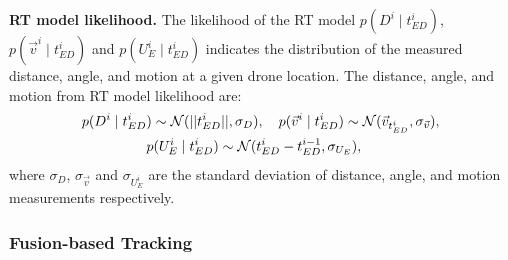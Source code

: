 \textbf{RT model likelihood.}
The likelihood of the RT model $p(D^i \mid t_{ED}^i)$, $p(\vec{v}^i \mid t_{ED}^i)$ and $p(U_E^{i} \mid t_{ED}^i)$ indicates the distribution of the measured distance, angle, and motion at a given drone location.
The distance, angle, and motion from RT model likelihood are:
\begin{equation}
\begin{aligned}
p(D^i \mid t_{ED}^i&) \sim  \mathcal{N}(||t_{ED}^i||, \sigma_{D}), \quad p(\vec{v}^i \mid t_{ED}^i) \sim \mathcal{N}(\vec{v}_{t_{ED}^i}, \sigma_{\vec{v}}), \\
& p(U_E^{i} \mid t_{ED}^i) \sim \mathcal{N}(t_{ED}^i - t_{ED}^{i - 1}, \sigma_{U_E}),
\vspace{-0.4cm}
\end{aligned}
\end{equation}
where $\sigma_{D}$, $\sigma_{\vec{v}}$ and $\sigma_{U_E^{i}}$ are the standard deviation of distance, angle, and motion measurements respectively.

\subsubsection{\textbf{Fusion-based Tracking}} \label{4.2.3}

